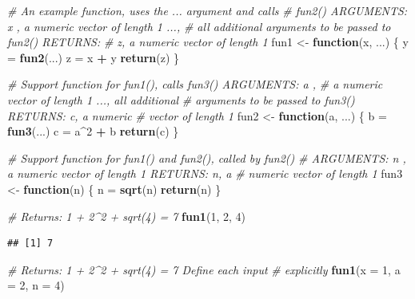 \documentclass[
]{book}
\newenvironment{Shaded}{\begin{snugshade}}{\end{snugshade}}
\newcommand{\CommentTok}[1]{\textcolor[rgb]{0.56,0.35,0.01}{\textit{#1}}}
\newcommand{\ControlFlowTok}[1]{\textcolor[rgb]{0.13,0.29,0.53}{\textbf{#1}}}
\newcommand{\DataTypeTok}[1]{\textcolor[rgb]{0.13,0.29,0.53}{#1}}
\newcommand{\DecValTok}[1]{\textcolor[rgb]{0.00,0.00,0.81}{#1}}
\newcommand{\KeywordTok}[1]{\textcolor[rgb]{0.13,0.29,0.53}{\textbf{#1}}}
\newcommand{\NormalTok}[1]{#1}
\newcommand{\OperatorTok}[1]{\textcolor[rgb]{0.81,0.36,0.00}{\textbf{#1}}}
\newcommand{\StringTok}[1]{\textcolor[rgb]{0.31,0.60,0.02}{#1}}
\begin{document}
\begin{Shaded}
\begin{Highlighting}[]
\CommentTok{# An example function, uses the ... argument and calls}
\CommentTok{# fun2() ARGUMENTS: x , a numeric vector of length 1 ...,}
\CommentTok{# all additional arguments to be passed to fun2() RETURNS:}
\CommentTok{# z, a numeric vector of length 1}
\NormalTok{fun1 <-}\StringTok{ }\ControlFlowTok{function}\NormalTok{(x, ...) \{}
\NormalTok{    y =}\StringTok{ }\KeywordTok{fun2}\NormalTok{(...)}
\NormalTok{    z =}\StringTok{ }\NormalTok{x }\OperatorTok{+}\StringTok{ }\NormalTok{y}
    \KeywordTok{return}\NormalTok{(z)}
\NormalTok{\}}

\CommentTok{# Support function for fun1(), calls fun3() ARGUMENTS: a ,}
\CommentTok{# a numeric vector of length 1 ..., all additional}
\CommentTok{# arguments to be passed to fun3() RETURNS: c, a numeric}
\CommentTok{# vector of length 1}
\NormalTok{fun2 <-}\StringTok{ }\ControlFlowTok{function}\NormalTok{(a, ...) \{}
\NormalTok{    b =}\StringTok{ }\KeywordTok{fun3}\NormalTok{(...)}
\NormalTok{    c =}\StringTok{ }\NormalTok{a}\OperatorTok{^}\DecValTok{2} \OperatorTok{+}\StringTok{ }\NormalTok{b}
    \KeywordTok{return}\NormalTok{(c)}
\NormalTok{\}}

\CommentTok{# Support function for fun1() and fun2(), called by fun2()}
\CommentTok{# ARGUMENTS: n , a numeric vector of length 1 RETURNS: n, a}
\CommentTok{# numeric vector of length 1}
\NormalTok{fun3 <-}\StringTok{ }\ControlFlowTok{function}\NormalTok{(n) \{}
\NormalTok{    n =}\StringTok{ }\KeywordTok{sqrt}\NormalTok{(n)}
    \KeywordTok{return}\NormalTok{(n)}
\NormalTok{\}}

\CommentTok{# Returns: 1 + 2^2 + sqrt(4) = 7}
\KeywordTok{fun1}\NormalTok{(}\DecValTok{1}\NormalTok{, }\DecValTok{2}\NormalTok{, }\DecValTok{4}\NormalTok{)}
\end{Highlighting}
\end{Shaded}

\begin{verbatim}
## [1] 7
\end{verbatim}

\begin{Shaded}
\begin{Highlighting}[]
\CommentTok{# Returns: 1 + 2^2 + sqrt(4) = 7 Define each input}
\CommentTok{# explicitly}
\KeywordTok{fun1}\NormalTok{(}\DataTypeTok{x =} \DecValTok{1}\NormalTok{, }\DataTypeTok{a =} \DecValTok{2}\NormalTok{, }\DataTypeTok{n =} \DecValTok{4}\NormalTok{)}
\end{Highlighting}
\end{Shaded}
\end{document}
